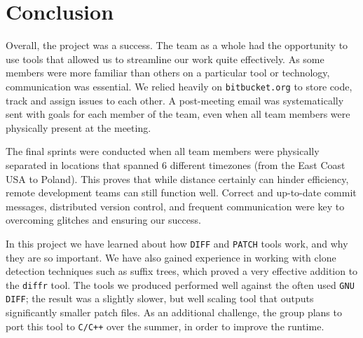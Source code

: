 \section{Conclusion}

Overall, the project was a success. The team as a whole had the opportunity to use tools that allowed us to streamline our work quite effectively. As some members were more familiar than others on a particular tool or technology, communication was essential. We relied heavily on \texttt{bitbucket.org} to store code, track and assign issues to each other. A post-meeting email was systematically sent with goals for each member of the team, even when all team members were physically present at the meeting.

The final sprints were conducted when all team members were physically separated in locations that spanned 6 different timezones (from the East Coast USA to Poland). This proves that while distance certainly can hinder efficiency, remote development teams can still function well. Correct and up-to-date commit messages, distributed version control, and frequent communication were key to overcoming glitches and ensuring our success.

In this project we have learned about how \texttt{DIFF} and \texttt{PATCH} tools work, and why they are so important. We have also gained experience in working with clone detection techniques such as suffix trees, which proved a very effective addition to the \texttt{diffr} tool. The tools we produced performed well against the often used \texttt{GNU DIFF}; the result was a slightly slower, but well scaling tool that outputs significantly smaller patch files. As an additional challenge, the group plans to port this tool to \texttt{C/C++} over the summer, in order to improve the runtime.
